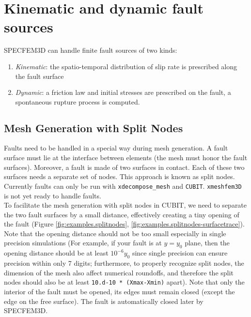 \chapter{Kinematic and dynamic fault sources}\label{cha:Fault-Kinematics-Dynamics}

SPECFEM3D can handle finite fault sources of two kinds:
\begin{enumerate}
\item \emph{Kinematic}: the spatio-temporal distribution of slip rate is
prescribed along the fault surface
\item \emph{Dynamic}: a friction law and initial stresses are prescribed
on the fault, a spontaneous rupture process is computed.
\end{enumerate}

\section{Mesh Generation with Split Nodes}\label{sec:Mesh-Generation-with}

Faults need to be handled in a special way during mesh generation.
A fault surface must lie at the interface between elements (the mesh
must honor the fault surfaces). Moreover, a fault is made of two surfaces
in contact. Each of these two surfaces needs a separate set of nodes.
This approach is known as \textquotedbl{}split nodes\textquotedbl{}.
Currently faults can only be run with \texttt{xdecompose\_mesh} and
\texttt{CUBIT}. \texttt{xmeshfem3D} is not yet ready to handle faults.\\


To facilitate the mesh generation with split nodes in CUBIT, we need
to separate the two fault surfaces by a small distance, effectively
creating a tiny opening of the fault (Figure \ref{fig:examples.splitnodes},
\ref{fig:examples.splitnodes-surfacetrace}). Note that the opening distance
should not be too small especially in single precision simulations
(For example, if your fault is at $y=y_0$ plane, then the opening distance
should be at least $10^{-6}y_0$ since single precision can ensure precision
within only 7 digits; furthermore, to properly recognize split nodes, the dimension
of the mesh also affect numerical roundoffs, and therefore the split nodes
should also be at least \texttt{10.d-10 * (Xmax-Xmin)} apart). Note that only the interior
of the fault must be opened, its edges must remain closed (except
the edge on the free surface). The fault is automatically closed later
by SPECFEM3D.\\

